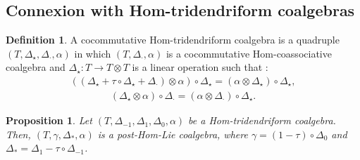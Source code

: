 \documentclass{article}
\newtheorem{prop}[thm]{Proposition}
\theoremstyle{definition}
\newtheorem{defn}[thm]{Definition}
\theoremstyle{remark}
\numberwithin{equation}{section}
\begin{document}
\subsection{Connexion with Hom-tridendriform coalgebras}
\begin{defn}\label{chd}
 A cocommutative Hom-tridendriform coalgebra is a quadruple $(T, \Delta_\star, \Delta_\cdot, \alpha)$ in which $(T, \Delta_\cdot, \alpha)$
 is a cocommutative Hom-coassociative coalgebra and
  $\Delta_\star : T\rightarrow T\otimes T$ is a linear operation such that :
\begin{eqnarray}
( (\Delta_\star + \tau\circ\Delta_\star +\Delta_\cdot)\otimes\alpha )\circ\Delta_\star=(\alpha\otimes\Delta_\star)\circ\Delta_\star,\label{d3}
\end{eqnarray}
\begin{eqnarray}
 (\Delta_\star\otimes\alpha)\circ\Delta_\cdot =(\alpha\otimes\Delta_\cdot)\circ\Delta_\star.\label{d4}
\end{eqnarray}
\end{defn}
\begin{prop}
 Let $(T, \Delta_{-1}, \Delta_1, \Delta_0, \alpha)$ be a Hom-tridendriform coalgebra. Then, $(T, \gamma, \Delta_\ast, \alpha)$ is a post-Hom-Lie coalgebra, where
$\gamma=(1-\tau)\circ\Delta_0$ and $\Delta_\ast= \Delta_1-\tau\circ\Delta_{-1}$.  
\end{prop}
\end{document}
